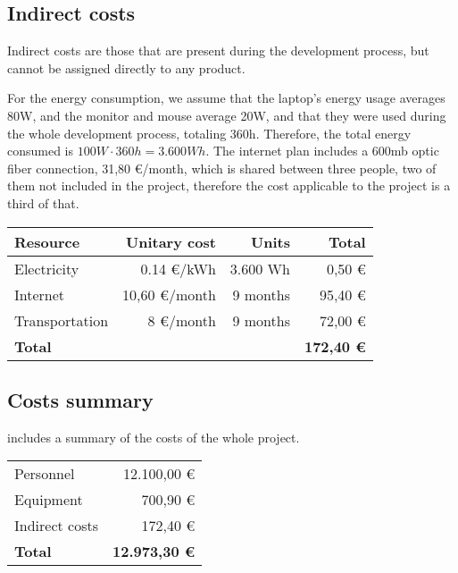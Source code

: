 \subsection{Indirect costs}
Indirect costs are those that are present during the development process, but cannot be assigned directly to any product.

For the energy consumption, we assume that the laptop's energy usage averages 80W, and the monitor and mouse average 20W, and that they were used during the whole development process, totaling 360h. Therefore, the total energy consumed is $100W \cdot 360 h = 3.600 Wh$. The internet plan includes a 600mb optic fiber connection, 31,80 €/month, which is shared between three people, two of them not included in the project, therefore the cost applicable to the project is a third of that.


\begin{table}[htb]
    {
      \begin{tabular}{lrrr}
        \toprule
        \textbf{Resource} & \textbf{Unitary cost} & \textbf{Units} & \textbf{Total} \\
        \midrule
        Electricity    &     0.14 €/kWh & 3.600 Wh &  0,50 € \\
        Internet       &  10,60 €/month & 9 months & 95,40 € \\
        Transportation &      8 €/month & 9 months & 72,00 € \\
        \midrule
        \textbf{Total} & & & \textbf{172,40 €} \\
        \bottomrule
      \end{tabular}
    }
\end{table}


\subsection{Costs summary}\label{subsec:cost-summary}
 includes a summary of the costs of the whole project.

\begin{table}[htb]
    {
      \begin{tabular}{p{5cm}r}
        \toprule
        Personnel          & 12.100,00 € \\
        Equipment          &    700,90 € \\
        Indirect costs     &    172,40 € \\
        \midrule
        \textbf{Total}     & \textbf{12.973,30 €} \\
        \bottomrule
      \end{tabular}
    }
\end{table}

